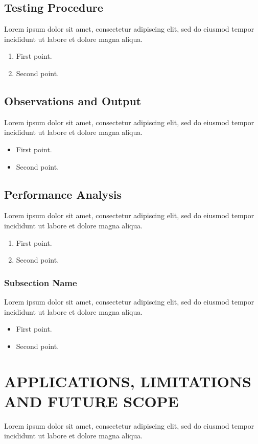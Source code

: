\documentclass[12pt,a4paper]{report}
\begin{document}
\section{Testing Procedure}
Lorem ipsum dolor sit amet, consectetur adipiscing elit, sed do eiusmod tempor incididunt ut labore et dolore magna aliqua. 

\begin{enumerate}
\item First point.
\item Second point.
\end{enumerate}

\section{Observations and Output}
Lorem ipsum dolor sit amet, consectetur adipiscing elit, sed do eiusmod tempor incididunt ut labore et dolore magna aliqua. 

\begin{itemize}
\item First point.
\item Second point.
\end{itemize}

\section{Performance Analysis}
Lorem ipsum dolor sit amet, consectetur adipiscing elit, sed do eiusmod tempor incididunt ut labore et dolore magna aliqua. 

\begin{enumerate}
\item First point.
\item Second point.
\end{enumerate}

\subsection{Subsection Name}
Lorem ipsum dolor sit amet, consectetur adipiscing elit, sed do eiusmod tempor incididunt ut labore et dolore magna aliqua. 

\begin{itemize}
\item First point.
\item Second point.
\end{itemize}



\chapter{APPLICATIONS, LIMITATIONS AND FUTURE SCOPE}
\thispagestyle{empty}Lorem ipsum dolor sit amet, consectetur adipiscing elit, sed do eiusmod tempor incididunt ut labore et dolore magna aliqua.   
\end{document}
